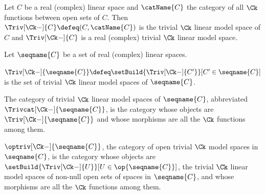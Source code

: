 \documentclass{article}
\begin{document}
\begin{definition}
\label{def:trivck}
Let $C$ be a real (complex) linear space and $\catName{C}$ the category
of all $\Ck$ functions between open sets of $C$. Then
$\Triv[\Ck-]{C} \defeq (C, \catName{C})$ is the trivial $\Ck$ linear
model space of $C$ and $\Triv[\Ck-]{C}$ is a real (complex) trivial
$\Ck$ linear model space.

Let $\seqname{C}$ be a set of real (complex) linear spaces.

$
  \Triv[\Ck-]{\seqname{C}}
  \defeq
  \setBuild
    {\Triv[\Ck-]{C'}}%
    [C' \in \seqname{C}]
$
is the set of trivial $\Ck$ linear model spaces of $\seqname{C}$.

The category of trivial $\Ck$ linear model spaces of $\seqname{C}$,
abbreviated $\Trivcat[\Ck-]{\seqname{C}}$, is the category whose
objects are $\Triv[\Ck-]{\seqname{C}}$ and whose morphisms are all the
$\Ck$ functions among them.

$\optriv[\Ck-]{\seqname{C}}$, the category of open trivial $\Ck$ model
spaces in $\seqname{C}$, is the category whose objects are
$\setBuild {\Triv[\Ck-]{U}}[U \in \op{\seqname{C}}]$, the trivial $\Ck$
linear model spaces of non-null open sets of spaces in $\seqname{C}$,
and whose morphisms are all the $\Ck$ functions among them.
\end{definition}
\end{document}
